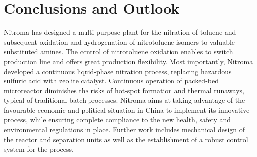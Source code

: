 \section{Conclusions and Outlook}
\label{sec:conclu}
Nitroma has designed a multi-purpose plant for the nitration of toluene and subsequent oxidation and hydrogenation of nitrotoluene isomers to valuable substituted amines. The control of nitrotoluene oxidation enables to switch production line and offers great production flexibility. Most importantly, Nitroma developed a continuous liquid-phase nitration process, replacing hazardous sulfuric acid with zeolite catalyst. Continuous operation of packed-bed microreactor diminishes the risks of hot-spot formation and thermal runaways, typical of traditional batch processes. Nitroma aims at taking advantage of the favourable economic and political situation in China to implement its innovative process, while ensuring complete compliance to the new health, safety and environmental regulations in place. Further work includes mechanical design of the reactor and separation units as well as the establishment of a robust control system for the process. 